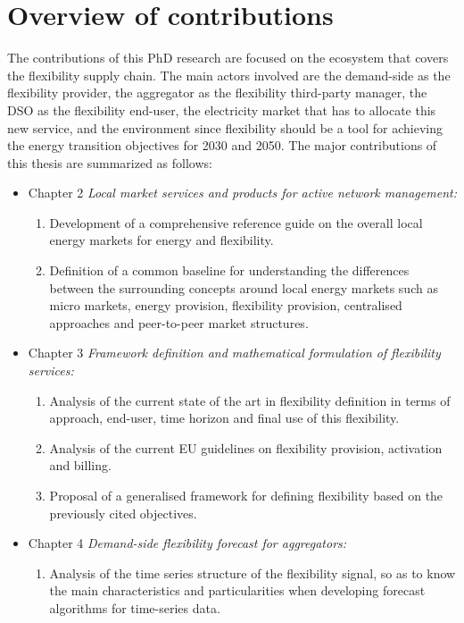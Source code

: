 \section{Overview of contributions}
The contributions of this PhD research are focused on the ecosystem that covers the flexibility supply chain. The main actors involved are the demand-side as the flexibility provider, the aggregator as the flexibility third-party manager, the DSO as the flexibility end-user, the electricity market that has to allocate this new service, and the environment since flexibility should be a tool for achieving the energy transition objectives for 2030 and 2050. The major contributions of this thesis are summarized as follows:  
\begin{itemize}
\item Chapter 2 \textit{Local market services and products for active network management:} 
	\begin{enumerate}
		\item Development of a comprehensive reference guide on the overall local energy markets for energy and flexibility.
		\item Definition of a common baseline for understanding the differences between the surrounding concepts around local energy markets such as micro markets, energy provision, flexibility provision, centralised approaches and peer-to-peer market structures.  
	\end{enumerate}
\item Chapter 3 \textit{Framework definition and mathematical formulation of flexibility services:} 
	\begin{enumerate}
		\item Analysis of the current state of the art in flexibility definition in terms of approach, end-user, time horizon and final use of this flexibility. 
		\item Analysis of the current EU guidelines on flexibility provision, activation and billing. 
		\item Proposal of a generalised framework for defining flexibility based on the previously cited objectives. 
	\end{enumerate}
\item Chapter 4 \textit{Demand-side flexibility forecast for aggregators:} 
	\begin{enumerate}
		\item Analysis of the time series structure of the flexibility signal, so as to know the main characteristics and particularities when developing forecast algorithms for time-series data. 

\end{enumerate}
\end{itemize}
